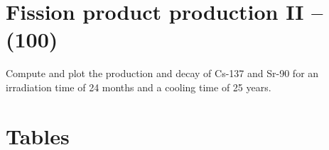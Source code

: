 \documentclass[11pt,a4paper]{article}
\makeatletter
\renewcommand\listoftables{%
    \@starttoc{lot}%
}
\makeatother
\begin{document}
\newpage

\section{Fission product production II -- (100)}
Compute and plot the production and decay of Cs-137 and Sr-90 for an irradiation time of 24 months and a cooling time of 25 years.





\pagestyle{fancyplain}
\fancyhf{} %
\renewcommand{\headrulewidth}{0pt} %
\rfoot{\fancyplain{}{\thepage}}
\nolinenumbers


%
%

\setlength{\bibhang}{0pt}

%


\newpage 


\section*{Tables}

{%
\let\oldnumberline\numberline%
\renewcommand{\numberline}{\tablename~\oldnumberline}%
\listoftables%
}


\newpage
\end{document}
